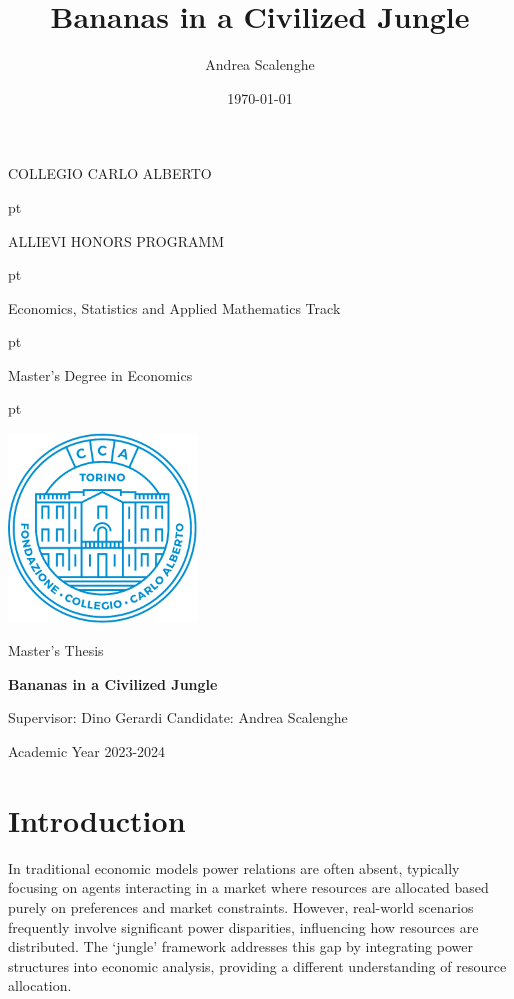 \documentclass[12pt,a4paper]{article}
\title{Bananas in a Civilized Jungle}
\author{Andrea Scalenghe}
\date{\today}
\numberwithin{theorem}{section}
\numberwithin{definition}{section}
\numberwithin{example}{section}
\numberwithin{exercise}{section}
\begin{document}
\thispagestyle{empty}

\centerline {\Large{\textsc{COLLEGIO CARLO ALBERTO}}}
 pt

\centerline {\Large{\textsc ALLIEVI HONORS PROGRAMM}}

 pt

\centerline {{\textsc Economics, Statistics and Applied Mathematics Track}}

 pt

\centerline {\Large{\textsc Master's Degree in Economics}}
 pt





\centerline {\includegraphics[width=5cm]{cca.png}}

\vskip 1.2cm

\centerline {\normalsize {Master's Thesis}} 

\vskip 0.7cm

\centerline {\Large {\bf Bananas in a Civilized Jungle} }

\vskip 1.7cm

\noindent Supervisor: Dino Gerardi
\hfill  {Candidate: Andrea Scalenghe}

\vskip 2.7cm


\centerline{Academic Year 2023-2024}

\newpage
{
\hypersetup{linkcolor = black}
\tableofcontents
{}
}
\newpage

\section*{Introduction}

In traditional economic models power relations are often absent, typically focusing on agents interacting in a market where resources are allocated based purely on preferences and market constraints. However, real-world scenarios frequently involve significant power disparities, influencing how resources are distributed. The `jungle' framework addresses this gap by integrating power structures into economic analysis, providing a different understanding of resource allocation.
\end{document}
